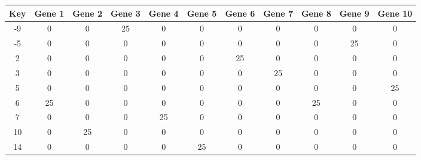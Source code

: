 \begin{tabular}{|c|c|c|c|c|c|c|c|c|c|c|}
\hline
Key & Gene 1 & Gene 2 & Gene 3 & Gene 4 & Gene 5 & Gene 6 & Gene 7 & Gene 8 & Gene 9 & Gene 10 \\
\hline
-9 & 0 & 0 & 25 & 0 & 0 & 0 & 0 & 0 & 0 & 0 \\
-5 & 0 & 0 & 0 & 0 & 0 & 0 & 0 & 0 & 25 & 0 \\
2 & 0 & 0 & 0 & 0 & 0 & 25 & 0 & 0 & 0 & 0 \\
3 & 0 & 0 & 0 & 0 & 0 & 0 & 25 & 0 & 0 & 0 \\
5 & 0 & 0 & 0 & 0 & 0 & 0 & 0 & 0 & 0 & 25 \\
6 & 25 & 0 & 0 & 0 & 0 & 0 & 0 & 25 & 0 & 0 \\
7 & 0 & 0 & 0 & 25 & 0 & 0 & 0 & 0 & 0 & 0 \\
10 & 0 & 25 & 0 & 0 & 0 & 0 & 0 & 0 & 0 & 0 \\
14 & 0 & 0 & 0 & 0 & 25 & 0 & 0 & 0 & 0 & 0 \\
\hline
\end{tabular}
